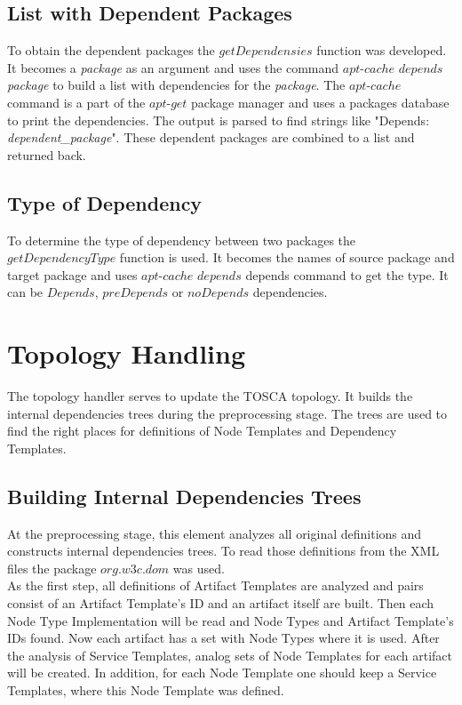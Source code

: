 \subsection*{List with Dependent Packages}
To obtain the dependent packages the $getDependensies$ function was developed.
It becomes a \emph{package} as an argument and uses the command $apt$-$cache$ $depends$ \emph{package} to build a list with dependencies for the \emph{package}. 
The $apt$-$cache$ command is a part of the $apt$-$get$ package manager and uses a packages database to print the dependencies.
The output is parsed to find strings like "Depends: \emph{dependent\_package}".
These dependent packages are combined to a list and returned back.

\subsection*{Type of Dependency}
To determine the type of dependency between two packages the $getDependencyType$ function is used.
It becomes the names of source package and target package and uses  $apt$-$cache$ $depends$ depends command to get the type.
It can be $Depends$, $preDepends$ or $noDepends$ dependencies.

\section{Topology Handling}\label{sec:imptophan}
The topology handler serves to update the TOSCA topology.
It builds the internal dependencies trees during the preprocessing stage.
The trees are used to find the right places for definitions of Node Templates and Dependency Templates.

\subsection*{Building Internal Dependencies Trees}
At the preprocessing stage, this element analyzes all original definitions and constructs internal dependencies trees. %
To read those definitions from the XML files the package $org$.$w3c$.$dom$ was used.\\
As the first step, all definitions of Artifact Templates are analyzed and pairs consist of an Artifact Template's ID and an artifact itself are built.
Then each Node Type Implementation will be read and Node Types and Artifact Template's IDs found. 
Now each artifact has a set with Node Types where it is used.
After the analysis of Service Templates, analog sets of Node Templates for each artifact will be created. 
In addition, for each Node Template one should keep a Service Templates, where this Node Template was defined.	

